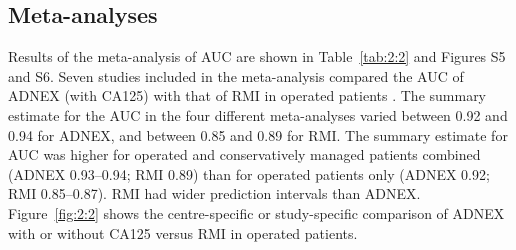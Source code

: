 \subsection{Meta-analyses}
Results of the meta-analysis of \gls{AUC} are shown in Table~\ref{tab:2:2} and Figures S5 and S6. Seven studies included in
the meta-analysis compared the \gls{AUC} of \gls{ADNEX} (with CA125) with that of \gls{RMI} in
operated patients
 \cite{vancalsterValidationModelsDiagnose2020,diazOvarianTumorsRisk2017a,tugPreoperativeDiscriminatingPerformance2020,behnamfarComparisonUltrasoundTumor2022,meysEstimatingRiskMalignancy2017,qianComparisonDiagnosticPerformances2021,borgesProspectiveExternalValidation2024}.
The summary estimate for the \gls{AUC} in the four different meta-analyses varied between
0.92 and 0.94 for \gls{ADNEX}, and between 0.85 and 0.89 for \gls{RMI}. The summary estimate
for \gls{AUC} was higher for operated and conservatively managed patients combined (\gls{ADNEX}
0.93--0.94; \gls{RMI} 0.89) than for operated patients only (\gls{ADNEX} 0.92; \gls{RMI} 0.85--0.87).
\gls{RMI} had wider prediction intervals than \gls{ADNEX}. Figure~\ref{fig:2:2} shows the centre-specific or
study-specific comparison of \gls{ADNEX} with or without CA125 versus \gls{RMI} in operated
patients.

